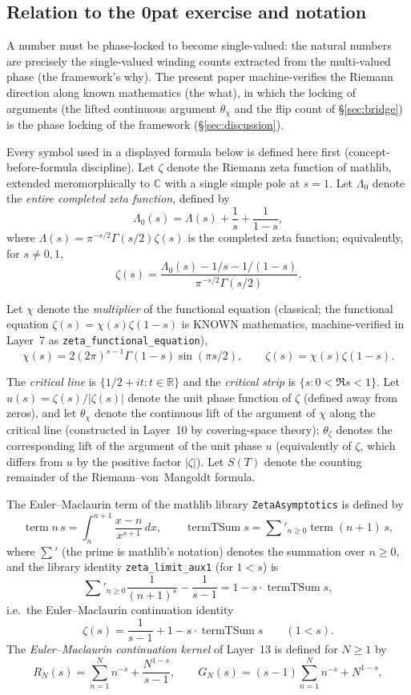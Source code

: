 \documentclass{article}
\newcommand{\C}{\mathbb{C}}
\newcommand{\R}{\mathbb{R}}
\newcommand{\GG}{\Gamma}
\newcommand{\zt}{\zeta}
\newcommand{\Lam}{\Lambda}
\newcommand{\Xchi}{\chi}
\newcommand{\tsum}{\textstyle\sum'}
\begin{document}
\subsection{Relation to the 0pat exercise and notation}
\label{sec:relation}

A number must be phase-locked to become single-valued: the natural
numbers are precisely the single-valued winding counts extracted from the
multi-valued phase (the framework's why). The present paper machine-verifies
the Riemann direction along known mathematics (the what), in which the locking of arguments (the lifted
continuous argument $\theta_\Xchi$ and the flip count of
\S\ref{sec:bridge}) is the phase locking of the framework
(\S\ref{sec:discussion}).

Every symbol used in a displayed formula below is defined here first
(concept-before-formula discipline). Let $\zt$ denote the Riemann zeta
function of mathlib, extended meromorphically to $\C$ with a single simple
pole at $s=1$. Let $\Lam_0$ denote the \emph{entire completed zeta
function}, defined by
\[
\Lam_0(s)=\Lam(s)+\frac{1}{s}+\frac{1}{1-s},
\]
where $\Lam(s)=\pi^{-s/2}\GG(s/2)\zt(s)$ is the completed zeta function;
equivalently, for $s\neq 0,1$,
\[
\zt(s)=\frac{\Lam_0(s)-1/s-1/(1-s)}{\pi^{-s/2}\GG(s/2)}.
\]

Let $\Xchi$ denote the \emph{multiplier} of the functional equation
(classical; the functional equation
$\zt(s)=\Xchi(s)\zt(1-s)$ is KNOWN mathematics, machine-verified in
Layer~7 as \texttt{zeta\_functional\_equation}),
\[
\Xchi(s)=2(2\pi)^{s-1}\GG(1-s)\sin(\pi s/2),
\qquad
\zt(s)=\Xchi(s)\zt(1-s).
\]

The \emph{critical line} is $\{1/2+it:t\in\R\}$ and the \emph{critical
strip} is $\{s:0<\Re s<1\}$. Let $u(s)=\zt(s)/|\zt(s)|$ denote the unit
phase function of $\zt$ (defined away from zeros), and let $\theta_\Xchi$
denote the continuous lift of the argument of $\Xchi$ along the critical
line (constructed in Layer~10 by covering-space theory); $\theta_{\zt}$
denotes the corresponding lift of the argument of the unit phase $u$
(equivalently of $\zt$, which differs from $u$ by the positive factor
$|\zt|$). Let
$S(T)$ denote the counting remainder of the Riemann--von~Mangoldt formula.

The Euler--Maclaurin term of the mathlib library \texttt{ZetaAsymptotics} is
defined by
\[
\operatorname{term} n\,s=\int_n^{n+1}\frac{x-n}{x^{s+1}}\,dx,\qquad
\operatorname{termTSum} s=\tsum_{n\ge 0}\operatorname{term}(n+1)\,s,
\]
where $\tsum$ (the prime is mathlib's notation) denotes the summation
over $n\ge 0$, and
the library identity \texttt{zeta\_limit\_aux1} (for $1<s$) is
\[
\tsum_{n\ge 0}\frac{1}{(n+1)^s}-\frac{1}{s-1}=1-s\cdot\operatorname{termTSum} s,
\]
i.e.\ the Euler--Maclaurin continuation identity
\begin{equation}
\label{eq:em}
\zt(s)=\frac{1}{s-1}+1-s\cdot\operatorname{termTSum} s\qquad(1<s).
\end{equation}
The \emph{Euler--Maclaurin continuation kernel} of Layer~13 is defined for
$N\ge 1$ by
\begin{equation}
\label{eq:kernel}
R_N(s)=\sum_{n=1}^{N}n^{-s}+\frac{N^{1-s}}{s-1},\qquad
G_N(s)=(s-1)\sum_{n=1}^{N}n^{-s}+N^{1-s},
\end{equation}
\end{document}
